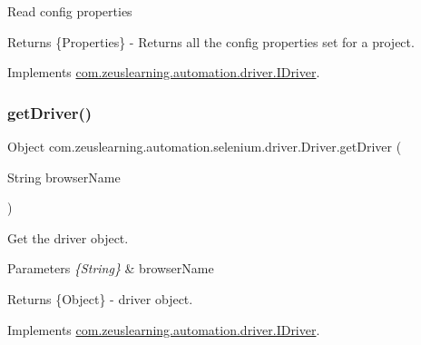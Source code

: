 Read config properties

\begin{DoxyReturn}{Returns}
\{Properties\} -\/ Returns all the config properties set for a project. 
\end{DoxyReturn}


Implements \hyperlink{interfacecom_1_1zeuslearning_1_1automation_1_1driver_1_1IDriver_a2530732df342f07743bed12deb55fee8}{com.\+zeuslearning.\+automation.\+driver.\+I\+Driver}.

\hypertarget{classcom_1_1zeuslearning_1_1automation_1_1selenium_1_1driver_1_1Driver_acf213a93d95506c1aa26b4e1b4154183}{}\label{classcom_1_1zeuslearning_1_1automation_1_1selenium_1_1driver_1_1Driver_acf213a93d95506c1aa26b4e1b4154183} 
\subsubsection{\texorpdfstring{get\+Driver()}{getDriver()}}
{\footnotesize\ttfamily Object com.\+zeuslearning.\+automation.\+selenium.\+driver.\+Driver.\+get\+Driver (\begin{DoxyParamCaption}\item[{String}]{browser\+Name }\end{DoxyParamCaption})\hspace{0.3cm}{\ttfamily [inline]}}

Get the driver object.


\begin{DoxyParams}{Parameters}
{\em \{\+String\}} & browser\+Name \\
\hline
\end{DoxyParams}
\begin{DoxyReturn}{Returns}
\{Object\} -\/ driver object. 
\end{DoxyReturn}


Implements \hyperlink{interfacecom_1_1zeuslearning_1_1automation_1_1driver_1_1IDriver_a9c4bbcfcf72e1b1f556c7c8298dc8e2a}{com.\+zeuslearning.\+automation.\+driver.\+I\+Driver}.

